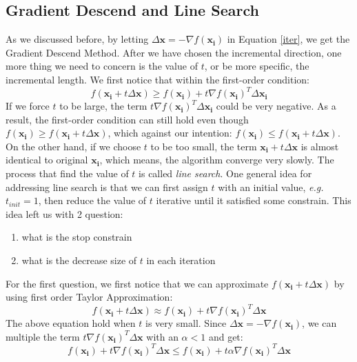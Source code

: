 \documentclass[10pt,a4paper]{article}
\begin{document}
\subsection{Gradient Descend and Line Search}
As we discussed before, by letting $\Delta \mathbf{x} = -\nabla f(\mathbf{x_{i}})$ in Equation \ref{iter}, we get the Gradient Descend Method. After we have chosen the incremental direction, one more thing we need to concern is the value of $t$, or be more specific, the incremental length. We first notice that within the first-order condition:
\begin{equation*}
	f(\mathbf{x_{i}} + t \Delta \mathbf{x}) \geq f(\mathbf{x_{i}}) + t \nabla f(\mathbf{x_{i}})^{T} \Delta \mathbf{x_{i}}
\end{equation*} 
If we force $t$ to be large, the term $t \nabla f(\mathbf{x_{i}})^{T} \Delta \mathbf{x_{i}}$ could be very negative. As a result, the first-order condition can still hold even though $f(\mathbf{x_{i}}) \geq f(\mathbf{x_{i}} + t \Delta \mathbf{x})$, which against our intention: $f(\mathbf{x_{i}}) \leq f(\mathbf{x_{i}} + t \Delta \mathbf{x})$. On the other hand, if we choose $t$ to be too small, the term $\mathbf{x_{i}} + t \Delta \mathbf{x}$ is almost identical to original $\mathbf{x_{i}}$, which means, the algorithm converge very slowly. The process that find the value of $t$ is called \textit{line search}. One general idea for addressing line search is that we can first assign $t$ with an initial value, \textsl{e.g.} $t_{init} = 1$, then reduce the value of $t$ iterative until it satisfied some constrain. This idea left us with 2 question:
	\begin{enumerate}
		\item what is the stop constrain
		\item what is the decrease size of $t$ in each iteration
	\end{enumerate}
For the first question, we first notice that we can approximate $f(\mathbf{x_{i}} + t \Delta \mathbf{x})$ by using first order Taylor Approximation:
\begin{equation*}
	f(\mathbf{x_{i}} + t \Delta \mathbf{x}) \approx f(\mathbf{x_{i}}) + t \nabla f(\mathbf{x_{i}})^{T} \Delta \mathbf{x}
\end{equation*}
The above equation hold when $t$ is very small. Since $\Delta \mathbf{x} = - \nabla f(\mathbf{x_{i}})$, we can multiple the term $t \nabla f(\mathbf{x_{i}})^{T} \Delta \mathbf{x}$ with an $\alpha < 1$ and get:
\begin{equation*}
	f(\mathbf{x_{i}}) + t \nabla f(\mathbf{x_{i}})^{T} \Delta \mathbf{x} \leq f(\mathbf{x_{i}}) + t \alpha \nabla f(\mathbf{x_{i}})^{T} \Delta \mathbf{x}
\end{equation*}
\end{document}
